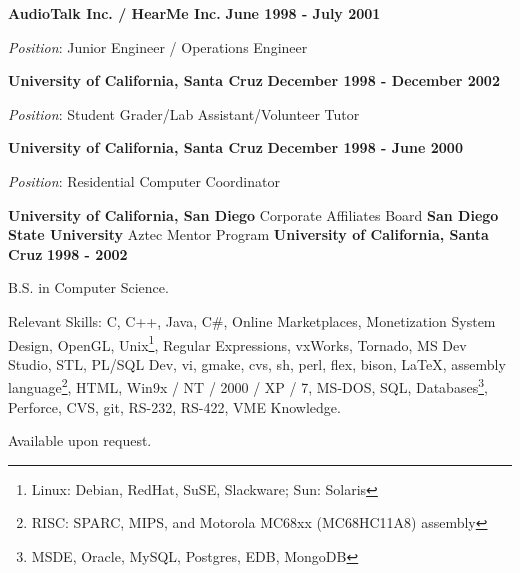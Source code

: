 \documentclass{article}
\begin{document}
\vspace{\baselineskip}
{\bf AudioTalk Inc. / HearMe Inc.} 
\hfill {\bf June 1998 - July 2001} 
\par
{\it Position}:  Junior Engineer / Operations Engineer
\par
\vspace{\baselineskip}
{\bf University of California, Santa Cruz} 
\hfill {\bf December 1998 - December 2002}
\par
{\it Position}:  Student Grader/Lab Assistant/Volunteer Tutor
\par
\vspace{\baselineskip}
{\bf University of California, Santa Cruz} 
\hfill {\bf December 1998 - June 2000}
\par
{\it Position}:  Residential Computer Coordinator
\par
\vspace{2\baselineskip}
{\bf University of California, San Diego} 
Corporate Affiliates Board
{\bf San Diego State University} 
Aztec Mentor Program
{\bf University of California, Santa Cruz} 
\hspace*{\fill} {\bf 1998 - 2002}
\par
\vspace{.03in}
B.S. in Computer Science.

\vspace{\baselineskip}
Relevant Skills:  C, C++, Java, C\#, Online Marketplaces, Monetization System
Design, OpenGL, Unix\footnote{Linux: Debian, RedHat, SuSE, Slackware;
Sun: Solaris}, Regular Expressions, vxWorks, Tornado, MS Dev Studio, STL, PL/SQL Dev, vi, gmake, cvs, sh, perl, 
flex, bison, \LaTeX, assembly language\footnote{RISC: SPARC, MIPS, and Motorola MC68xx (MC68HC11A8)
assembly}, HTML, Win9x / NT / 2000 / XP / 7, MS-DOS, SQL,
Databases\footnote{MSDE, Oracle, MySQL, Postgres, EDB, MongoDB}, Perforce, CVS, git, RS-232, RS-422, VME Knowledge.
\vspace{2\baselineskip}

\par

Available upon request.
\end{document}
